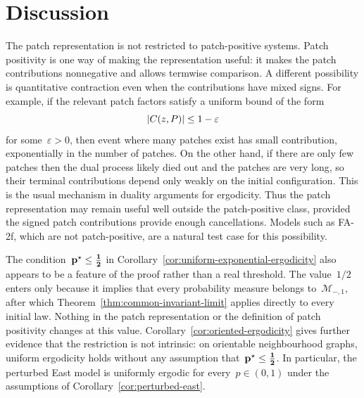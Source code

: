 \documentclass[EJP,preprint,NODS,nobera]{ejpecp}
\begin{document}
\section{Discussion}
\label{sec:discussion}

The patch representation is not restricted to patch-positive systems. Patch
positivity is one way of making the representation useful: it makes the patch
contributions nonnegative and allows termwise comparison. A different
possibility is quantitative contraction even when the contributions have mixed
signs. For example, if the relevant patch factors satisfy a uniform bound of
the form
\begin{equation*}
\left|C(z,P)\right|
\leq
1-\varepsilon
\end{equation*}
for some~$\varepsilon>0$, then event where many patches exist has small contribution, exponentially in the number of patches. On the other hand,
if there are only few patches then the dual process likely died out and the patches are very long, so their terminal contributions depend only weakly on the initial configuration. This is the usual mechanism in duality arguments for ergodicity. Thus the patch representation may remain useful well
outside the patch-positive class, provided the signed patch contributions provide enough cancellations. Models such as
FA-2f, which are not patch-positive, are a natural test case for this
possibility.

The condition~$\mathbf{p}^\star\leq\boldsymbol{\tfrac12}$ in
Corollary~\ref{cor:uniform-exponential-ergodicity} also appears to be a
feature of the proof rather than a real threshold. The value~$1/2$ enters
only because it implies that every probability measure belongs to~$\mathcal M_{-,1}$, after which Theorem~\ref{thm:common-invariant-limit}
applies directly to every initial law. Nothing in the patch representation or
the definition of patch positivity changes at this value. Corollary~\ref{cor:oriented-ergodicity} gives further evidence that the restriction is
not intrinsic: on orientable neighbourhood graphs, uniform ergodicity holds
without any assumption that~$\mathbf{p}^\star\leq\boldsymbol{\tfrac12}$. In
particular, the perturbed East model is uniformly ergodic for every~$p\in(0,1)$ under the assumptions of Corollary~\ref{cor:perturbed-east}.
\end{document}
